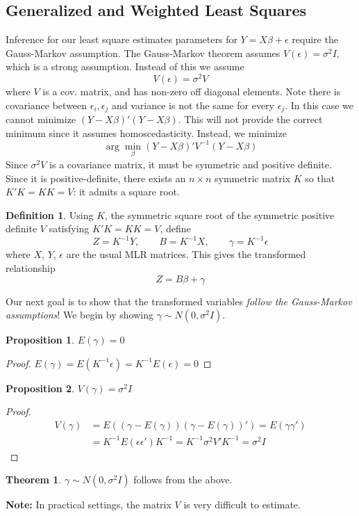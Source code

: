 \documentclass[12pt, a4paper]{article}
\theoremstyle{definition}
\newtheorem{thm}{Theorem}
\newtheorem{proposition}{Proposition}
\newtheorem{definition}{Definition}
\newcommand{\eps}{\epsilon}
\newcommand{\BB}[1]{\left(#1\right)}
\newcommand{\Note}{\textbf{Note: }}
\begin{document}
	\subsection{Generalized and Weighted Least Squares}
	
	Inference for our least square estimates parameters for $Y = X \beta + \eps$ require the Gauss-Markov assumption. The Gauss-Markov theorem assumes $V(\eps) = \sigma^2 I$, which is a strong assumption. Instead of this we assume 
	$$V(\eps) = \sigma^2 V$$
	 where $V$ is a cov. matrix, and has non-zero off diagonal elements. Note there is covariance between $\eps_i, \eps_j$ and variance is not the same for every $\eps_j$. In this case we cannot minimize $(Y - X\beta)'(Y-X\beta)$. This will not provide the correct minimum since it assumes homoscedasticity. Instead, we minimize
	$$
		\arg \min_\beta (Y - X\beta)'V^{-1}(Y-X\beta)
	$$
	Since $\sigma^2V$ is a covariance matrix, it must be symmetric and positive definite. Since it is positive-definite, there exists an $n \times n$ symmetric matrix $K$ so that $K'K = KK = V$: it admits a square root.
	\begin{definition}
		Using $K$, the symmetric square root of the symmetric positive definite $V$ satisfying $K'K = KK = V$, define 
			$$Z = K^{-1}Y, \qquad B=K^{-1}X,\qquad \gamma = K^{-1}\eps$$
		where $X$, $Y$, $\eps$ are the usual MLR matrices. This gives the transformed relationship 
		$$ Z = B\beta + \gamma $$
	\end{definition} 
	Our next goal is to show that the transformed variables \textit{follow the Gauss-Markov assumptions}! We begin by showing $\gamma \sim N(0, \sigma^2I)$.
	\begin{proposition}
		$E(\gamma) = 0$
	\end{proposition}
	\begin{proof}
		$E(\gamma) = E(K^{-1} \eps ) = K^{-1}E(\eps) = 0$
	\end{proof}
	\begin{proposition}
		$V(\gamma) = \sigma^2I$
	\end{proposition}
	\begin{proof}
		\begin{align*}
			V(\gamma) &= E\BB{(\gamma - E(\gamma))(\gamma - E(\gamma))'} = E\BB{\gamma\gamma'} \\
			&= K^{-1}E(\eps\eps')K^{-1} = K^{-1}\sigma^2V'K^{-1} = \sigma^2 I 
		\end{align*}
	\end{proof}
	\begin{thm}
		$\gamma \sim N(0, \sigma^2I)$ follows from the above.
	\end{thm}
	\Note In practical settings, the matrix $V$ is very difficult to estimate. \\
	
\end{document}

